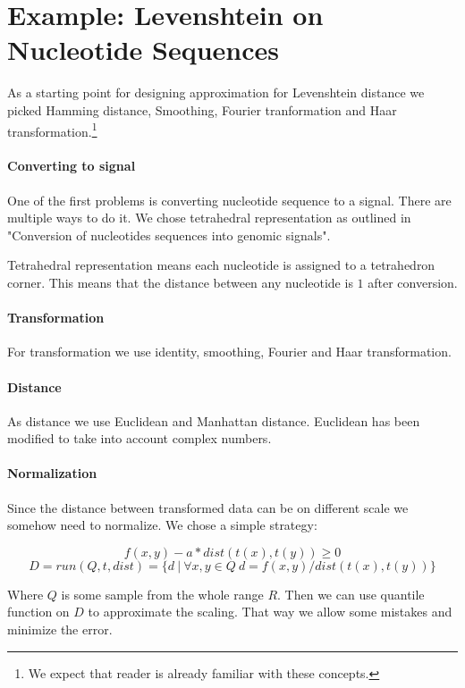 \documentclass [12pt, a4]{article} %
\begin{document}
\section{Example: Levenshtein on Nucleotide Sequences}

As a starting point for designing approximation for Levenshtein distance
we picked Hamming distance, Smoothing, Fourier tranformation and Haar transformation.\footnote{We expect that reader is already familiar with these concepts.}

\paragraph{Converting to signal}

One of the first problems is converting nucleotide sequence to a signal. There are multiple ways to do it. We chose tetrahedral representation as outlined in "Conversion of nucleotides sequences into genomic signals". \cite{cristea2002conversion}

Tetrahedral representation means each nucleotide is assigned to a tetrahedron corner. This means that the distance between any nucleotide is $1$ after conversion.

\paragraph{Transformation}

For transformation we use identity, smoothing, Fourier and Haar transformation.

\paragraph{Distance}

As distance we use Euclidean and Manhattan distance. Euclidean has been modified to take into account complex numbers.

\paragraph{Normalization}

Since the distance between transformed data can be on different scale we somehow need to normalize. We chose a simple strategy:

$$f(x,y) - a*dist(t(x),t(y)) \geq 0$$
$$D = run(Q, t, dist) = \{ d ~ | ~ \forall x,y \in Q ~ d = f(x,y) / dist(t(x),t(y)) \}$$

Where $Q$ is some sample from the whole range $R$. Then we can use quantile function on $D$ to approximate the scaling. That way we allow some mistakes and minimize the error.
\end{document}
